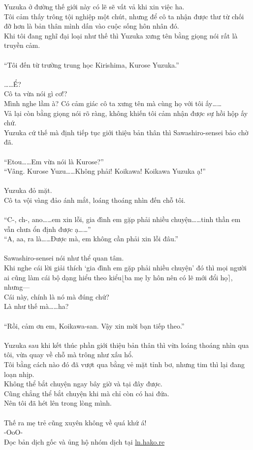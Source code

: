 \documentclass[12pt,a4paper, twosides]{book}
\begin{document}
Yuzuka ở đường thế giới này có lẽ sẽ vất vả khi xin việc ha.\\
Tôi cảm thấy trông tội nghiệp một chút, nhưng để cô ta nhận được thư từ chối đỡ hơn là bản thân mình dấn vào cuộc sống hôn nhân đó.\\
Khi tôi đang nghĩ đại loại như thế thì Yuzuka xưng tên bằng giọng nói rất là truyền cảm.\\
\\
“Tôi đến từ trường trung học Kirishima, Kurose Yuzuka.”\\
\\
……Ể?\\
Cô ta vừa nói gì cơ!?\\
Mình nghe lầm à? Có cảm giác cô ta xưng tên mà cùng họ với tôi ấy……\\
Vả lại còn bằng giọng nói rõ ràng, không khiến tôi cảm nhận được sự hồi hộp ấy chứ.\\
Yuzuka cứ thế mà định tiếp tục giới thiệu bản thân thì Sawashiro-sensei bảo chờ đã.\\
\\
“Etou……Em vừa nói là Kurose?”\\
“Vâng. Kurose Yuzu……Không phải! Koikawa! Koikawa Yuzuka ạ!”\\
\\
Yuzuka đỏ mặt.\\
Cô ta vội vàng đảo ánh mắt, loáng thoáng nhìn đến chỗ tôi.\\
\\
“C-, ch-, ano……em xin lỗi, gia đình em gặp phải nhiều chuyện……tinh thần em vẫn chưa ổn định được ạ……”\\
“A, aa, ra là……Được mà, em không cần phải xin lỗi đâu.”\\
\\
Sawashiro-sensei nói như thể quan tâm.\\
Khi nghe cái lời giải thích ‘gia đình em gặp phải nhiều chuyện’ đó thì mọi người ai cũng làm cái bộ dạng hiểu theo kiểu$\lfloor$ba mẹ ly hôn nên có lẽ mới đổi họ$\rceil$, nhưng—\\
Cái này, chính là nó mà đúng chứ?\\
Là như thế mà……ha?\\
\\
“Rồi, cảm ơn em, Koikawa-san. Vậy xin mời bạn tiếp theo.”\\
\\
Yuzuka sau khi kết thúc phần giới thiệu bản thân thì vừa loáng thoáng nhìn qua tôi, vừa quay về chỗ mà trông như xấu hổ.\\
Tôi bằng cách nào đó đã vượt qua bằng vẻ mặt tỉnh bơ, nhưng tim thì lại đang loạn nhịp.\\
Không thể bắt chuyện ngay bây giờ và tại đây được.\\
Cũng chẳng thể bắt chuyện khi mà chỉ còn có hai đứa.\\
Nên tôi đã hét lên trong lòng mình.\\
\\
Thế ra mẹ trẻ cũng xuyên không về quá khứ á!\\
-OoO-\\
Đọc bản dịch gốc và ủng hộ nhóm dịch tại \href{https://ln.hako.re/}{ln.hako.re}\\
\newpage
\end{document}

